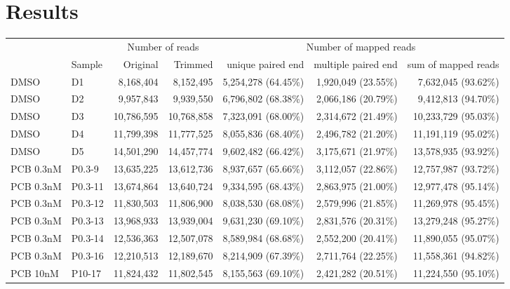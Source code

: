 \documentclass{article}
\begin{document}
\section{Results}

\begin{table}
  \begin{tabular}{ll|rr|rrr}
         &         &  \multicolumn{2}{c}{Number of reads} & \multicolumn{3}{c}{Number of mapped reads} \\
         & Sample  & Original  & Trimmed            & unique paired end & multiple paired end & sum of mapped reads \\
  \hline                                          
  DMSO   & D1      &  8,168,404 &  8,152,495        & 5,254,278 (64.45\%) & 1,920,049 (23.55\%) &  7,632,045 (93.62\%)   \\
  DMSO   & D2      &  9,957,843 &  9,939,550        & 6,796,802 (68.38\%) & 2,066,186 (20.79\%) &  9,412,813 (94.70\%)   \\
  DMSO   & D3      & 10,786,595 & 10,768,858        & 7,323,091 (68.00\%)    & 2,314,672 (21.49\%) & 10,233,729 (95.03\%) \\
  DMSO   & D4      & 11,799,398 & 11,777,525        & 8,055,836 (68.40\%)  & 2,496,782 (21.20\%)  & 11,191,119 (95.02\%) \\
  DMSO   & D5      & 14,501,290 & 14,457,774        & 9,602,482 (66.42\%) & 3,175,671 (21.97\%) & 13,578,935 (93.92\%) \\
    \hline
  PCB 0.3nM & P0.3-9  & 13,635,225 & 13,612,736        & 8,937,657 (65.66\%) & 3,112,057 (22.86\%) & 12,757,987 (93.72\%) \\
  PCB 0.3nM & P0.3-11 & 13,674,864 & 13,640,724        & 9,334,595 (68.43\%) & 2,863,975 (21.00\%)    & 12,977,478 (95.14\%) \\
  PCB 0.3nM & P0.3-12 & 11,830,503 & 11,806,900        & 8,038,530 (68.08\%) & 2,579,996 (21.85\%) & 11,269,978 (95.45\%) \\
  PCB 0.3nM & P0.3-13 & 13,968,933 & 13,939,004        & 9,631,230 (69.10\%)  & 2,831,576 (20.31\%) & 13,279,248 (95.27\%) \\
  PCB 0.3nM & P0.3-14 & 12,536,363 & 12,507,078        & 8,589,984 (68.68\%) & 2,552,200 (20.41\%) & 11,890,055 (95.07\%) \\
  PCB 0.3nM & P0.3-16 & 12,210,513 & 12,189,670        & 8,214,909 (67.39\%) & 2,711,764 (22.25\%) & 11,558,361 (94.82\%) \\
    \hline
  PCB 10nM & P10-17  & 11,824,432 & 11,802,545        & 8,155,563 (69.10\%)  & 2,421,282 (20.51\%) & 11,224,550 (95.10\%)  \\

\end{tabular}
\end{table}
\end{document}
